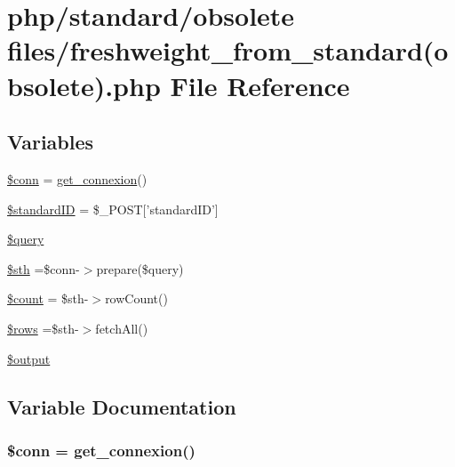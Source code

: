 \hypertarget{freshweight__from__standard_07obsolete_08_8php}{\section{php/standard/obsolete files/freshweight\-\_\-from\-\_\-standard(obsolete).php File Reference}
\label{freshweight__from__standard_07obsolete_08_8php}
}
\subsection*{Variables}
\begin{DoxyCompactItemize}
\item 
\hyperlink{freshweight__from__standard_07obsolete_08_8php_aa8a5a87b9c1a6a0819b88447cbe41877}{\$conn} = \hyperlink{php__functions_8php_ace18bc10f3fd08f92688ac743e0d8c2e}{get\-\_\-connexion}()
\item 
\hyperlink{freshweight__from__standard_07obsolete_08_8php_a0c541a369e4a0434108a7d145751bb23}{\$standard\-I\-D} = \$\-\_\-\-P\-O\-S\-T\mbox{[}'standard\-I\-D'\mbox{]}
\item 
\hyperlink{freshweight__from__standard_07obsolete_08_8php_af59a5f7cd609e592c41dc3643efd3c98}{\$query}
\item 
\hyperlink{freshweight__from__standard_07obsolete_08_8php_afa9126f9664959c02795be300a135f93}{\$sth} =\$conn-\/$>$prepare(\$query)
\item 
\hyperlink{freshweight__from__standard_07obsolete_08_8php_af789423037bbc89dc7c850e761177570}{\$count} = \$sth-\/$>$row\-Count()
\item 
\hyperlink{freshweight__from__standard_07obsolete_08_8php_ace2ec39e7df3899fa8df9640ec274b03}{\$rows} =\$sth-\/$>$fetch\-All()
\item 
\hyperlink{freshweight__from__standard_07obsolete_08_8php_a73004ce9cd673c1bfafd1dc351134797}{\$output}
\end{DoxyCompactItemize}


\subsection{Variable Documentation}
\hypertarget{freshweight__from__standard_07obsolete_08_8php_aa8a5a87b9c1a6a0819b88447cbe41877}{
\subsubsection[{\$conn}]{\setlength{\rightskip}{0pt plus 5cm}\$conn = {\bf get\-\_\-connexion}()}}\label{freshweight__from__standard_07obsolete_08_8php_aa8a5a87b9c1a6a0819b88447cbe41877}


